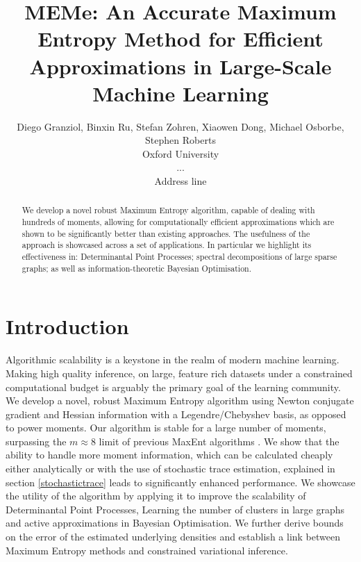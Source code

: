 \documentclass[letterpaper]{article} %
\begin{document}
%
\title{MEMe: An Accurate Maximum Entropy Method for Efficient Approximations in Large-Scale Machine Learning}
\author{Diego Granziol, Binxin Ru, Stefan Zohren, Xiaowen Dong, Michael Osborbe, Stephen Roberts\\ 
	Oxford University \\ ... \\ Address line}

\maketitle
\begin{abstract}
We develop a novel robust Maximum Entropy algorithm, capable of dealing with hundreds of moments, allowing for computationally efficient approximations which are shown to be significantly better than existing approaches. The usefulness of the approach is showcased across a set of applications. In particular we highlight its effectiveness in: Determinantal Point Processes; spectral decompositions of large sparse graphs; as well as information-theoretic Bayesian Optimisation.
\end{abstract}


\section{Introduction}

Algorithmic scalability is a keystone in the realm of modern machine learning. Making high quality inference, on large, feature rich datasets under a constrained computational budget is arguably the primary goal of the learning community. 
We develop a novel, robust Maximum Entropy algorithm using Newton conjugate gradient and Hessian information with a Legendre/Chebyshev basis, as opposed to power moments. Our algorithm is stable for a large number of moments, surpassing the $m \approx 8$ limit of previous MaxEnt algorithms \cite{DBLP:conf/bigdataconf/GranziolR17,bandyopadhyay2005maximum,mead1984maximum}. We show that the ability to handle more moment information, which can be calculated cheaply either analytically or with the use of stochastic trace estimation, explained in section \ref{stochastictrace} leads to significantly enhanced performance. We showcase the utility of the algorithm by applying it to improve the scalability of Determinantal Point Processes, Learning the number of clusters in large graphs and active approximations in Bayesian Optimisation. We further derive bounds on the error of the estimated underlying densities and establish a link between Maximum Entropy methods and constrained variational inference.
\end{document}
